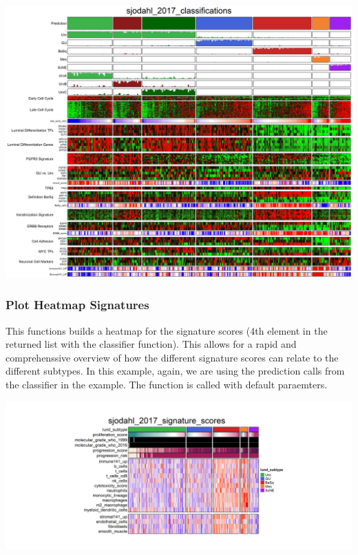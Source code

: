 \documentclass[
]{article}
\begin{document}
\begin{center}\includegraphics[width=1\linewidth]{../man/figures/sjodahl_2017_classifications_heatmap_scores} \end{center}

\subsubsection{Plot Heatmap Signatures}\label{plot-heatmap-signatures-1}

This functions builds a heatmap for the signature scores (4th element in
the returned list with the classifier function). This allows for a rapid
and comprehenssive overview of how the different signature scores can
relate to the different subtypes. In this example, again, we are using
the prediction calls from the classifier in the example. The function is
called with default paraemters.

\begin{center}\includegraphics[width=1\linewidth]{../man/figures/sjodahl_2017_signature_scores_heatmap_scores} \end{center}
\end{document}
